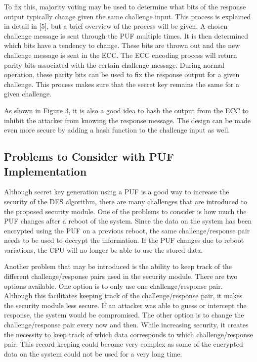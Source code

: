 \documentclass[letterpaper, 10 pt, conference]{ieeeconf}  %
\begin{document}
To fix this, majority voting may be used to determine what bits of the response output typically change given the same challenge input.  This process is explained in detail in [5], but a brief overview of the process will be given.  A chosen challenge message is sent through the PUF multiple times.  It is then determined which bits have a tendency to change.  These bits are thrown out and the new challenge message is sent in the ECC.  The ECC encoding process will return parity bits associated with the certain challenge message.  During normal operation, these parity bits can be used to fix the response output for a given challenge.  This process makes sure that the secret key remains the same for a given challenge.

As shown in Figure 3, it is also a good idea to hash the output from the ECC to inhibit the attacker from knowing the response message.  The design can be made even more secure by adding a hash function to the challenge input as well.  

\subsection{Problems to Consider with PUF Implementation}

Although secret key generation using a PUF is a good way to increase the security of the DES algorithm, there are many challenges that are introduced to the proposed security module.  One of the problems to consider is how much the PUF changes after a reboot of the system.  Since the data on the system has been encrypted using the PUF on a previous reboot, the same challenge/response pair needs to be used to decrypt the information.  If the PUF changes due to reboot variations, the CPU will no longer be able to use the stored data.

Another problem that may be introduced is the ability to keep track of the different challenge/response pairs used in the security module.  There are two options available.  One option is to only use one challenge/response pair.  Although this facilitates keeping track of the challenge/response pair, it makes the security module less secure.  If an attacker was able to guess or intercept the response, the system would be compromised.  The other option is to change the challenge/response pair every now and then.  While increasing security, it creates the necessity to keep track of which data corresponds to which challenge/response pair.  This record keeping could become very complex as some of the encrypted data on the system could not be used for a very long time.
\end{document}
